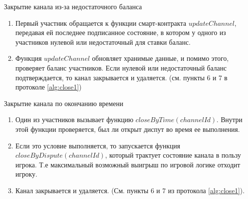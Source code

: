 \begin{algorithm}
\caption{Закрытие канала из-за недостаточного баланса} \label{alg:close2}
\begin{enumerate}
	\item Первый участник обращается к функции смарт-контракта $updateChannel$, передавая ей последнее подписанное состояние, в котором у одного из участников нулевой или недостаточный для ставки баланс.
	\item Функция $updateChannel$ обновляет хранимые данные, и помимо этого, проверяет баланс участников. Если нулевой или недостаточный баланс подтверждается, то канал закрывается и удаляется. (см. пункты 6 и 7 в протоколе \autoref{alg:close1})
\end{enumerate}
\end{algorithm}


\begin{algorithm}
\caption{Закрытие канала по окончанию времени} \label{alg:close3}
 \begin{enumerate}
	\item Один из участников вызывает функцию $closeByTime(channelId)$. Внутри этой функции проверяется, был ли открыт диспут во время ее выполнения.
	\item Если это условие выполняется, то запускается функция $closeByDispute(channelId)$, который трактует состояние канала в пользу игрока. Т.е максимальный возможный выигрыш по игровой логике отходит игроку. 
	\item Канал закрывается и удаляется. (См. пункты 6 и 7 из протокола \autoref{alg:close1}).
\end{enumerate}
\end{algorithm}

